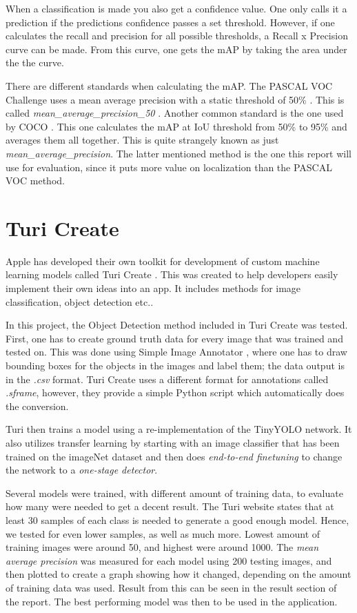  When a classification is made you also get a confidence value. One only calls it a prediction if the predictions confidence passes a set threshold. However, if one calculates the recall and precision for all possible thresholds, a Recall x Precision curve can be made. From this curve, one gets the mAP by taking the area under the the curve.

There are different standards when calculating the mAP. The PASCAL VOC Challenge uses a mean average precision with a static threshold of 50\%
 \cite{PASCAL}. This is called   \textit{mean\_average\_precision\_50} . Another common standard is the one used by COCO  \cite{COCO}. This one calculates the mAP at IoU threshold from 50\%  to 95\%  and averages them all together. This is quite strangely known as just \textit{mean\_average\_precision}. The latter mentioned method is the one this report will use for evaluation, since it puts more value on localization than the PASCAL VOC method.

\section{Turi Create}
\label{sec:turi}
Apple has developed their own toolkit for development of custom machine learning models called Turi Create \cite{turiCreate}. This was created to help developers easily implement their own ideas into an app. It includes methods for image classification, object detection etc.. 

In this project, the Object Detection method included in Turi Create was tested. First, one
 has to create ground truth data for every image that was trained and tested on. This was
 done using Simple Image Annotator \cite{simpleImage}, where one has to draw bounding
  boxes for the objects in the images and label them; the data output is in the \textit{.csv} format.  Turi Create uses a different format for annotations called \textit{.sframe},
  however, they provide a simple Python script which automatically does the conversion. 

Turi then trains a model using a re-implementation of the TinyYOLO network. It also utilizes transfer learning by starting with an image classifier that has been trained on the imageNet dataset and then does \textit{end-to-end finetuning} to change the network to a \textit{one-stage detector}.

Several models were trained, with different amount of training data, to evaluate how many
 were needed to get a decent result. The Turi website states that at least 30 samples of
each class is needed to generate a good enough model. Hence, we tested for even lower
samples, as well as much more. Lowest amount of training images were around 50, and
highest  were around 1000. The \textit{mean average precision} was measured for each model using 200 testing images, and then plotted to create a graph showing how it
 changed, depending on the amount of training data was used. Result from this can be
 seen in the result section of the report. The best performing model was then to be used in the application.

